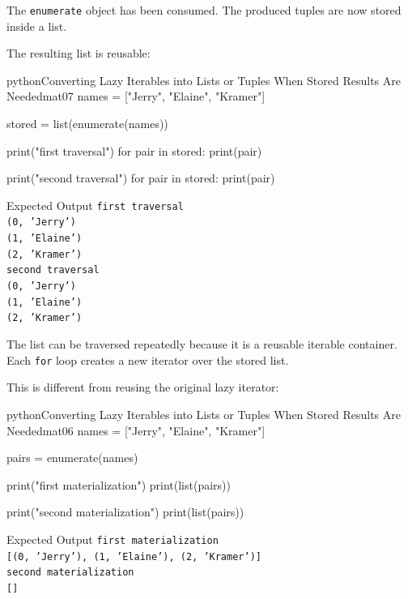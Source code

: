 The \texttt{enumerate} object has been consumed. The produced tuples are now stored inside a list.

The resulting list is reusable:

\begin{codebox}[]{python}{Converting Lazy Iterables into Lists or Tuples When Stored Results Are Needed}{mat07}
names = ["Jerry", "Elaine", "Kramer"]

stored = list(enumerate(names))

print("first traversal")
for pair in stored:
    print(pair)

print("second traversal")
for pair in stored:
    print(pair)
\end{codebox}


\begin{iobox}{Expected Output}
\texttt{first traversal} \\
\texttt{(0, 'Jerry')} \\
\texttt{(1, 'Elaine')} \\
\texttt{(2, 'Kramer')} \\
\texttt{second traversal} \\
\texttt{(0, 'Jerry')} \\
\texttt{(1, 'Elaine')} \\
\texttt{(2, 'Kramer')} \\
\end{iobox}


The list can be traversed repeatedly because it is a reusable iterable container. Each \texttt{for} loop creates a new iterator over the stored list.

This is different from reusing the original lazy iterator:

\begin{codebox}[]{python}{Converting Lazy Iterables into Lists or Tuples When Stored Results Are Needed}{mat06}
names = ["Jerry", "Elaine", "Kramer"]

pairs = enumerate(names)

print("first materialization")
print(list(pairs))

print("second materialization")
print(list(pairs))
\end{codebox}


\begin{iobox}{Expected Output}
\texttt{first materialization} \\
\texttt{[(0, 'Jerry'), (1, 'Elaine'), (2, 'Kramer')]} \\
\texttt{second materialization} \\
\texttt{[]} \\
\end{iobox}


